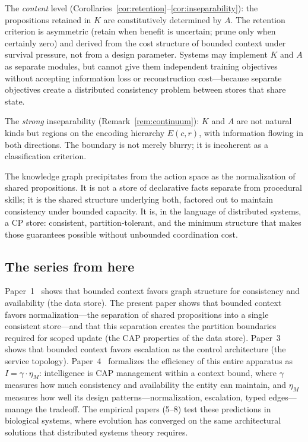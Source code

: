 \documentclass[11pt]{article}
\theoremstyle{definition}
\theoremstyle{remark}
\begin{document}
The \emph{content} level (Corollaries~\ref{cor:retention}--\ref{cor:inseparability}):
the propositions retained in $K$ are constitutively determined by
$A$. The retention criterion is asymmetric (retain when benefit is
uncertain; prune only when certainly zero) and derived from the cost
structure of bounded context under survival pressure, not from a
design parameter. Systems may implement $K$ and $A$ as separate
modules, but cannot give them independent training objectives without
accepting information loss or reconstruction cost---because separate
objectives create a distributed consistency problem between stores
that share state.

The \emph{strong} inseparability (Remark~\ref{rem:continuum}): $K$
and $A$ are not natural kinds but regions on the encoding hierarchy
$E(c,r)$, with information flowing in both directions. The boundary
is not merely blurry; it is incoherent as a classification criterion.

The knowledge graph precipitates from the action space as the
normalization of shared propositions. It is not a store of declarative
facts separate from procedural skills; it is the shared structure
underlying both, factored out to maintain consistency under bounded
capacity. It is, in the language of distributed systems, a CP store:
consistent, partition-tolerant, and the minimum structure that makes
those guarantees possible without unbounded coordination cost.

\subsection*{The series from here}

Paper~1~\cite{McCarthy2026a} shows that bounded context favors
graph structure for consistency and availability (the data store).
The present paper shows that bounded context favors
normalization---the separation of shared propositions into a single
consistent store---and that this separation creates the partition
boundaries required for scoped update (the CAP properties of the
data store). Paper~3~\cite{McCarthy2026c}
shows that bounded context favors escalation as the control
architecture (the service topology). Paper~4~\cite{McCarthy2026d}
formalizes the efficiency of this entire apparatus as $I = \gamma
\cdot \eta_M$: intelligence is CAP management within a context bound,
where $\gamma$ measures how much consistency and availability the
entity can maintain, and $\eta_M$ measures how well its design
patterns---normalization, escalation, typed edges---manage the
tradeoff. The empirical papers (5--8) test these predictions in
biological systems, where evolution has converged on the same
architectural solutions that distributed systems theory requires.
\end{document}
